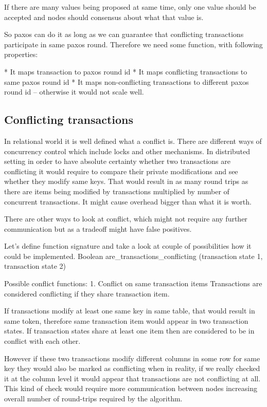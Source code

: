 If there are many values being proposed at same time, only one value should be accepted and nodes should consensus about what that value is.


So paxos can do it as long as we can guarantee that conflicting transactions participate in same paxos round. Therefore we need some function, with following properties:


* It maps transaction to paxos round id
* It maps conflicting transactions to same paxos round id 
* It maps non-conflicting transactions to different paxos round id -- otherwise it would not scale well.


\subsection{Conflicting transactions}
In relational world it is well defined what a conflict is. There are different ways of concurrency control which include locks and other mechanisms. In distributed setting in order to have absolute certainty whether two transactions are conflicting it would require to compare their private modifications and see whether they modify same keys. That would result in as many round trips as there are items being modified by transactions multiplied by number of concurrent transactions. It might cause overhead bigger than what it is worth. 


There are other ways to look at conflict, which might not require any further communication but as a tradeoff might have false positives. 


Let’s define function signature and take a look at couple of possibilities how it could be implemented.
Boolean are_transactions_conflicting (transaction state 1, transaction state 2)


Possible conflict functions:
1. Conflict on same transaction items
Transactions are considered conflicting if they share transaction item.


If transactions modify at least one same key in same table, that would result in same token, therefore same transaction item would appear in two transaction states. If transaction states share at least one item then are considered to be in conflict with each other.


However if these two transactions modify different columns in some row for same key they would also be marked as conflicting when in reality, if we really checked it at the column level it would appear that transactions are not conflicting at all. This kind of check would require more communication between nodes increasing overall number of round-trips required by the algorithm.


